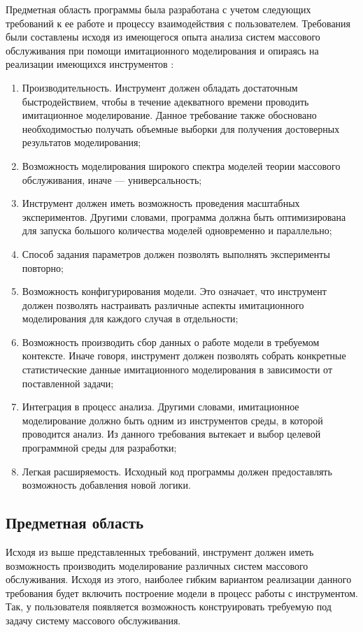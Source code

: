 Предметная область программы была разработана с учетом следующих требований к ее работе и процессу взаимодействия с пользователем. Требования были составлены исходя из имеющегося опыта анализа систем массового обслуживания при помощи имитационного моделирования и опираясь на реализации имеющихся инструментов \cite{yakimov2017comparison}:
\begin{enumerate}
	\item Производительность. Инструмент должен обладать достаточным быстродействием, чтобы в течение адекватного времени проводить имитационное моделирование. Данное требование также обосновано необходимостью получать объемные выборки для получения достоверных результатов моделирования;
	\item Возможность моделирования широкого спектра моделей теории массового обслуживания, иначе --- универсальность;
	\item Инструмент должен иметь возможность проведения масштабных экспериментов. Другими словами, программа должна быть оптимизирована для запуска большого количества моделей одновременно и параллельно;
	\item Способ задания параметров должен позволять выполнять эксперименты повторно;
	\item Возможность конфигурирования модели. Это означает, что инструмент должен позволять настраивать различные аспекты имитационного моделирования для каждого случая в отдельности;
	\item Возможность производить сбор данных о работе модели в требуемом контексте. Иначе говоря, инструмент должен позволять собрать конкретные статистические данные имитационного моделирования в зависимости от поставленной задачи;
	\item Интеграция в процесс анализа. Другими словами, имитационное моделирование должно быть одним из инструментов среды, в которой проводится анализ. Из данного требования вытекает и выбор целевой программной среды для разработки;
	\item Легкая расширяемость. Исходный код программы должен предоставлять возможность добавления новой логики.
\end{enumerate}

\subsection{Предметная область}
Исходя из выше представленных требований, инструмент должен иметь возможность производить моделирование различных систем массового обслуживания. Исходя из этого, наиболее гибким вариантом реализации данного требования будет включить построение модели в процесс работы с инструментом. Так, у пользователя появляется возможность конструировать требуемую под задачу систему массового обслуживания.

